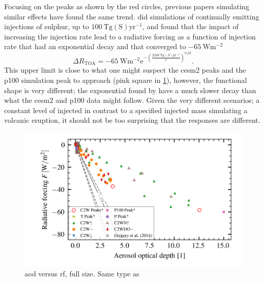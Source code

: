 \documentclass[twocol]{ametsocV5}
\newcommand{\iso}[1][i]{{#1}njected \ce{SO2}}
\begin{document}
Focusing on the peaks as shown by the red circles, previous papers simulating similar
effects have found the same trend. \citet{niemeier2015} did simulations of continually
emitting injections of sulphur, up to \( \SI{100}{\tera\gram
  \mathrm{(S)}\mathrm{yr}^{-1}} \), and found that the impact of increasing the injection
rate lead to a radiative forcing as a function of injection rate that had an exponential
decay and that converged to \( \SI{-65}{\watt\meter^{-2}} \)
\begin{equation}
  \Delta
  R_{\mathrm{TOA}} =
  -\SI{65}{\watt\metre^{-2}}
  \mathrm{e}^{-\left(\frac{\SI{2246}{\tera\gram(S)yr^{-1}}}{x}\right)^{0.23}}.
  \label{eq:niemeier_exponential}
\end{equation}
This upper limit is close to what one might suspect the \acrshort{cesm2} peaks and the
\acrfull{p100} simulation peak to approach (pink square in \cref{fig:aod_vs_toa_full}),
however, the functional shape is very different; the exponential found by
\citet{niemeier2015} have a much slower decay than what the \acrshort{cesm2} and
\acrshort{p100} data might follow. Given the very different scenarios; a constant level
of \iso{} in contrast to a specified injected mass simulating a volcanic eruption, it
should not be too surprising that the responses are different.

\begin{figure}[t]
  \begin{center}
    \includegraphics[width=0.95\linewidth]{figures/aod_vs_toa_avg_full.png}
  \end{center}
  \caption{\acrshort{aod} versus \acrshort{rf}, full size. Same type as
    \citet{gregory2016}}%
  \label{fig:aod_vs_toa_full}
\end{figure}
\end{document}
